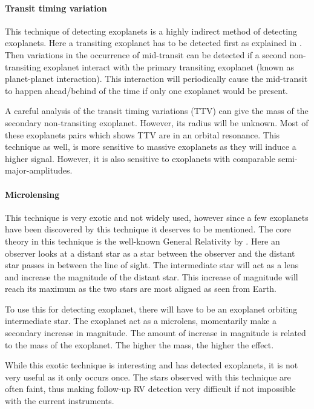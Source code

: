 \paragraph{Transit timing variation}

This technique of detecting exoplanets is a highly indirect method of detecting exoplanets. Here a
transiting exoplanet has to be detected first as explained in . Then
variations in the occurrence of mid-transit can be detected if a second non-transiting exoplanet
interact with the primary transiting exoplanet (known as planet-planet interaction). This
interaction will periodically cause the mid-transit to happen ahead/behind of the time if only one
exoplanet would be present.

A careful analysis of the transit timing variations (TTV) can give the mass of the secondary
non-transiting exoplanet. However, its radius will be unknown. Most of these exoplanets pairs which
shows TTV are in an orbital resonance. This technique as well, is more sensitive to massive
exoplanets as they will induce a higher signal. However, it is also sensitive to exoplanets with
comparable semi-major-amplitudes.


\paragraph{Microlensing}

This technique is very exotic and not widely used, however since a few exoplanets have been
discovered by this technique it deserves to be mentioned. The core theory in this technique is the
well-known General Relativity by \citet{Einstein1916}. Here an observer looks at a distant star as a
star between the observer and the distant star passes in between the line of sight. The intermediate
star will act as a lens and increase the magnitude of the distant star. This increase of magnitude
will reach its maximum as the two stars are most aligned as seen from Earth.

To use this for detecting exoplanet, there will have to be an exoplanet orbiting intermediate star.
The exoplanet act as a microlens, momentarily make a secondary increase in magnitude. The amount of
increase in magnitude is related to the mass of the exoplanet. The higher the mass, the higher the
effect.

While this exotic technique is interesting and has detected exoplanets, it is not very useful as it
only occurs once. The stars observed with this technique are often faint, thus making follow-up RV
detection very difficult if not impossible with the current instruments.


